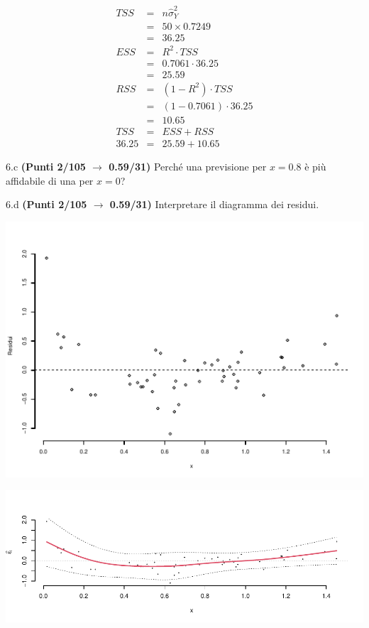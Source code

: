 \documentclass[
  11pt,
]{book}
\theoremstyle{mytheoremstyle}
\theoremstyle{mydefstyle}
\newenvironment{sol}
  {
  \begin{tcolorbox}[enhanced,breakable,arc=0.1mm,boxrule=1pt,colback=white,colframe=iblue,
  title=\bf \fontfamily{lmss}\selectfont \hspace{.5 cm} Soluzione,drop fuzzy shadow]

}{
\end{tcolorbox}
  }
\begin{document}
\begin{sol}
\begin{eqnarray*}
   TSS &=& n\hat\sigma^2_Y\\
      &=& 50 \times 0.7249 \\
      &=&  36.25 \\
   ESS &=& R^2\cdot TSS\\
      &=&  0.7061 \cdot 36.25 \\
      &=& 25.59 \\
   RSS &=& (1-R^2)\cdot TSS\\
      &=& (1- 0.7061 )\cdot 36.25 \\
      &=&  10.65 \\
   TSS &=& ESS+RSS \\ 36.25  &=&  25.59 + 10.65 
  \end{eqnarray*}

\end{sol}

6.c \textbf{(Punti 2/105 \(\rightarrow\) 0.59/31)} Perché una previsione per \(x=0.8\) è più affidabile di una per \(x=0\)?

6.d \textbf{(Punti 2/105 \(\rightarrow\) 0.59/31)} Interpretare il diagramma dei residui.

\begin{center}\includegraphics{Esami_passati_con_soluzioni_files/figure-latex/2023-74,-1} \end{center}

\begin{sol}

\begin{center}\includegraphics{Esami_passati_con_soluzioni_files/figure-latex/2023-75,-1} \end{center}

\end{sol}
\end{document}
